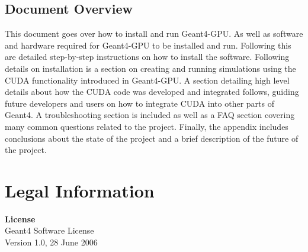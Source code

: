 \documentclass[12pt]{article}
\begin{document}
\subsection{Document Overview} %
This document goes over how to install and run Geant4-GPU. As well as software and hardware required for Geant4-GPU to be installed and run. Following this are detailed step-by-step instructions on how to install the software. Following details on installation is a section on creating and running simulations using the CUDA functionality introduced in Geant4-GPU. A section detailing high level details about how the CUDA code was developed and integrated follows, guiding future developers and users on how to integrate CUDA into other parts of Geant4. A troubleshooting section is included as well as a FAQ section covering many common questions related to the project. Finally, the appendix includes conclusions about the state of the project and a brief description of the future of the project.

\section{Legal Information}	%
\textbf{License}\\
Geant4 Software License \\
Version 1.0,  28 June 2006\\
 
\end{document}
